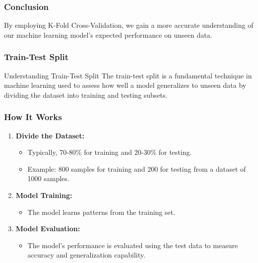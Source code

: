 \documentclass[aspectratio=169]{beamer}
\begin{document}
\begin{frame}[fragile]
    \frametitle{Conclusion}
    By employing K-Fold Cross-Validation, we gain a more accurate understanding of our machine learning model's expected performance on unseen data.
\end{frame}

\begin{frame}
    \frametitle{Train-Test Split}
    \begin{block}{Understanding Train-Test Split}
        The train-test split is a fundamental technique in machine learning used to assess how well a model generalizes to unseen data by dividing the dataset into training and testing subsets.
    \end{block}
\end{frame}

\begin{frame}
    \frametitle{How It Works}
    \begin{enumerate}
        \item \textbf{Divide the Dataset:}
        \begin{itemize}
            \item Typically, 70-80\% for training and 20-30\% for testing.
            \item Example: 800 samples for training and 200 for testing from a dataset of 1000 samples.
        \end{itemize}
        
        \item \textbf{Model Training:}
        \begin{itemize}
            \item The model learns patterns from the training set.
        \end{itemize}
        
        \item \textbf{Model Evaluation:}
        \begin{itemize}
            \item The model's performance is evaluated using the test data to measure accuracy and generalization capability.
        \end{itemize}
    \end{enumerate}
\end{frame}
\end{document}

